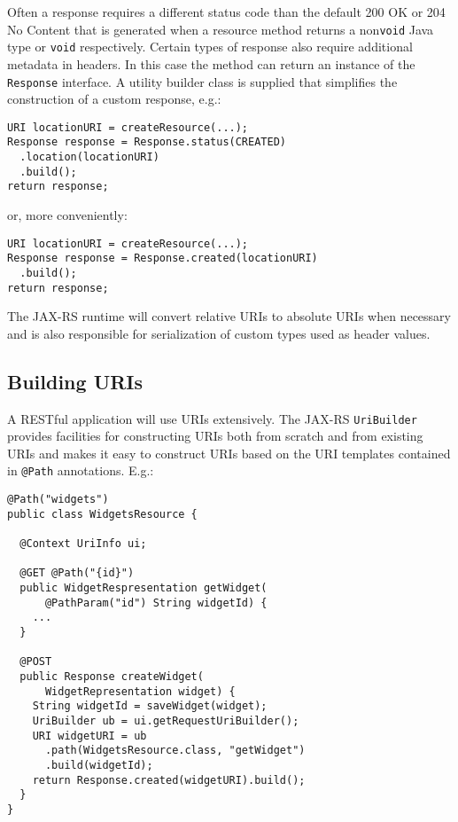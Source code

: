 \documentclass{acm_proc_article-sp}
\begin{document}
Often a response requires a different status code than the default 200 OK or 204 No Content that is generated when a resource method returns a non\texttt{void} Java type or \texttt{void} respectively. Certain types of response also require additional metadata in headers. In this case the method can return an instance of the \texttt{Response} interface. A utility builder class is supplied that simplifies the construction of a custom response, e.g.:

\begin{verbatim}
URI locationURI = createResource(...);
Response response = Response.status(CREATED)
  .location(locationURI)
  .build();
return response;
\end{verbatim}

or, more conveniently:

\begin{verbatim}
URI locationURI = createResource(...);
Response response = Response.created(locationURI)
  .build();
return response;
\end{verbatim}

The JAX-RS runtime will convert relative URIs to absolute URIs when necessary and is also responsible for serialization of custom types used as header values.

\subsection{Building URIs}

A RESTful application will use URIs extensively. The JAX-RS \texttt{UriBuilder} provides facilities for constructing URIs both from scratch and from existing URIs and makes it easy to construct URIs based on the URI templates contained in \texttt{@Path} annotations. E.g.:

\begin{verbatim}
@Path("widgets")
public class WidgetsResource {

  @Context UriInfo ui;
  
  @GET @Path("{id}")
  public WidgetRespresentation getWidget(
      @PathParam("id") String widgetId) {
    ...
  }
    
  @POST
  public Response createWidget(
      WidgetRepresentation widget) {
    String widgetId = saveWidget(widget);
    UriBuilder ub = ui.getRequestUriBuilder();
    URI widgetURI = ub
      .path(WidgetsResource.class, "getWidget")
      .build(widgetId);
    return Response.created(widgetURI).build();
  }
}
\end{verbatim}
\end{document}
